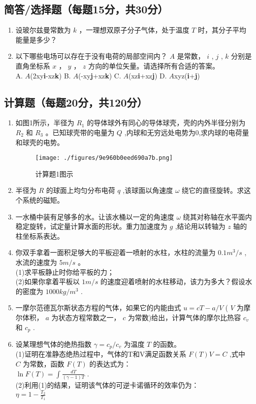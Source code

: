 


\subsection{简答/选择题（每题15分，共30分）}
\begin{enumerate}
\item 设玻尔兹曼常数为 $k$ ，一理想双原子分子气体，处于温度 $T$ 时，其分子平均能量是多少？
\item 以下哪些电场可以存在于没有电荷的局部空间内？ $A$ 是常数， $i$ , $j$ , $k$ 分别是直角坐标系 $x$ ， $y$ ， $z$ 方向的单位矢量。请选择所有合适的答案。\\
A. $A$(2xy\textbf{i}-xz\textbf{k}) B. $A$(-xy\textbf{j}+xz\textbf{k}) C. $A$(xz\textbf{i}+xz\textbf{j}) D. $A$xyz(\textbf{i}+\textbf{j})
\end{enumerate}
\subsection{计算题（每题20分，共120分）}
\begin{enumerate}
\item 如图1所示，半径为 $R_1$ 的导体球外有同心的导体球壳，壳的内外半径分别为 $R_2$ 和 $R_3$ 。已知球壳带的电量为 $Q$ ,内球和无穷远处电势为0,求内球的电荷量和球壳的电势。\\
\begin{figure}[ht]
\centering
\texttt{[image: ./figures/9e960b0eed690a7b.png]}
\caption{计算题1图示} \label{fig_USTC16_1}
\end{figure}
\item 半径为 $R$ 的球面上均匀分布电荷 $q$ ,该球面以角速度 $\omega$ 绕它的直径旋转。求这个系统的磁矩。
\item 一水桶中装有足够多的水。让该水桶以一定的角速度 $\omega$ 绕其对称轴在水平面内稳定旋转，试定量计算水面的形状。重力加速度为 $g$ ,结论用以转轴为 $z$ 轴的柱坐标系表达。
\item 你双手拿着一面积足够大的平板迎着一喷射的水柱，水柱的流量为 $0.1m^{3}/s$ ,水流的速度为 $5m/s$ 。\\
(1)求平板静止时你给平板的力；\\
(2)如果你拿着平板以 $1m/s$ 的速度迎着喷射的水柱移动，该力为多大？假设水的密度为 $1000kg/m^{3}$ .
\item 一摩尔范德瓦尔斯状态方程的气体，如果它的内能由式 $u=cT-a/V$ ( $V$ 为摩尔体积， $a$ 为状态方程常数之一， $c$ 为常数)给出，计算气体的摩尔比热容 $c_v$ 和 $c_p$ .
\item 设某理想气体的绝热指数 $\gamma =c_p/c_v$ 为温度 $T$ 的函数。\\
(1)证明在准静态绝热过程中，气体的T和V满足函数关系 $F(T)V=C$ ,式中 $C$ 为常数，函数 $F(T)$ 的表达式为：\\
 $\ln F(T)=\int \frac{dT}{(\gamma-1)T}$ .\\
(2)利用(1)的结果，证明该气体的可逆卡诺循环的效率仍为：\\
$\eta =1-\frac{T_2}{T_1}$
\end{enumerate}